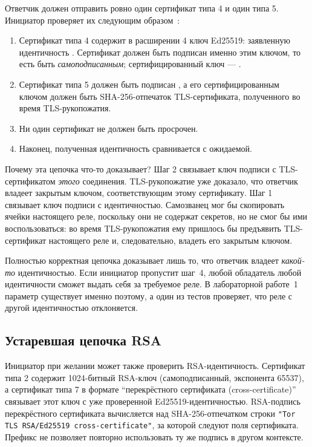 Ответчик должен отправить ровно один сертификат типа 4 и один типа 5. Инициатор проверяет их следующим образом~:
\begin{enumerate}
  \item Сертификат типа 4 содержит в расширении 4 ключ Ed25519: заявленную идентичность . Сертификат должен быть подписан именно этим ключом, то есть быть \emph{самоподписанным}; сертифицированный ключ --- .
  \item Сертификат типа 5 должен быть подписан , а его сертифицированным ключом должен быть SHA-256-отпечаток TLS-сертификата, полученного во время TLS-рукопожатия.
  \item Ни один сертификат не должен быть просрочен.
  \item Наконец, полученная идентичность сравнивается с ожидаемой.
\end{enumerate}

Почему эта цепочка что-то доказывает? Шаг 2 связывает ключ подписи с TLS-сертификатом \emph{этого} соединения. TLS-рукопожатие уже доказало, что ответчик владеет закрытым ключом, соответствующим этому сертификату. Шаг 1 связывает ключ подписи с идентичностью. Самозванец мог бы скопировать ячейки  настоящего реле, поскольку они не содержат секретов, но не смог бы ими воспользоваться: во время TLS-рукопожатия ему пришлось бы предъявить TLS-сертификат настоящего реле и, следовательно, владеть его закрытым ключом.

\begin{attenzione}
Полностью корректная цепочка доказывает лишь то, что ответчик владеет \emph{какой-то} идентичностью. Если инициатор пропустит шаг~4, любой обладатель любой идентичности сможет выдать себя за требуемое реле. В лабораторной работе~1 параметр  существует именно поэтому, а один из тестов проверяет, что реле с другой идентичностью отклоняется.
\end{attenzione}

\subsection{Устаревшая цепочка RSA}

Инициатор при желании может также проверить RSA-идентичность. Сертификат типа 2 содержит 1024-битный RSA-ключ (самоподписанный, экспонента 65537), а сертификат типа 7 в формате \enquote{перекрёстного сертификата (cross-certificate)} связывает этот ключ с уже проверенной Ed25519-идентичностью. RSA-подпись перекрёстного сертификата вычисляется над SHA-256-отпечатком строки \texttt{"Tor TLS RSA/Ed25519 cross-certificate"}, за которой следуют поля сертификата. Префикс не позволяет повторно использовать ту же подпись в другом контексте.

